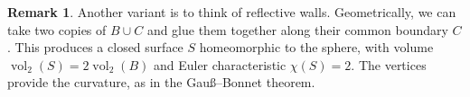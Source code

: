 \documentclass[a4paper]{amsart}
\numberwithin{equation}{section}
\theoremstyle{plain}
\theoremstyle{definition}
\newtheorem{remark}[theorem]{Remark}
\DeclareMathOperator{\vol}{vol}
\begin{document}
\begin{remark}
  Another variant is to think of reflective walls.
  Geometrically, we can take two copies of $B \cup C$
  and glue them together along their common boundary $C$.
  This produces a closed surface $S$ homeomorphic to the sphere,
  with volume $\vol_2(S) = 2 \vol_2(B)$ and Euler characteristic $\chi(S) = 2$.
  The vertices provide the curvature, as in the Gauß--Bonnet theorem.
\end{remark}




\end{document}
